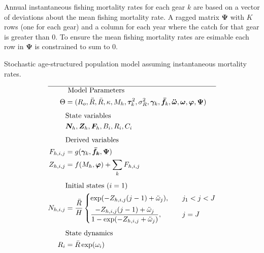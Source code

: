     Annual instantaneous fishing mortality rates for each gear $k$ are based on a vector of deviations about the mean fishing mortality rate.  A ragged matrix $\bm{\Psi}$  with $K$ rows (one for each gear) and a column for each year where the catch for that gear is greater than 0.  To ensure the mean fishing mortality rates are esimable each row in $\bm{\Psi}$  is constrained to sum to 0.



    \begin{table}
    \centering
    \caption{ Stochastic age-structured population model assuming instantaneous mortality rates. }
    \label{tab:stochastic_population_model}
    \tableEq
    \begin{align}
        \hline \nonumber
        &\mbox{ Model Parameters } \nonumber \\
        \Theta &= (R_o,\ddot{R},\bar{R},\kappa,M_h,\bm{\tau}^{2}_{k},
        \sigma_R^2,\bm{\gamma}_k, \bm{\bar{f}}_k,\bm{\ddot{\omega}},
        \bm{\omega},\bm{\varphi},\bm{\Psi})                             \label{T3.1} \\[1ex]
        &\mbox{State variables} \nonumber \\
        &\bm{N}_h, \bm{Z}_h, \bm{F}_h, B_i, R_i, C_i                    \label{T3.2} \\[1ex]
        &\mbox{Derived variables} \nonumber \\
        F_{h,i,j}&= g(\bm{\gamma}_k,\bm{\bar{f}_k},\bm{\Psi})           \label{T3.3} \\
        Z_{h,i,j}&= f(M_h,\bm{\varphi})
        + \sum_k  F_{h,i,j}                                             \label{T3.4} \\[1ex]
        &\mbox{Initial states $(i = 1)$} \nonumber \\
        N_{h,i,j} &= \dfrac{\ddot{R}}{H}
        \begin{cases}
        \exp(-Z_{h,i,j}(j-1)+\ddot{\omega}_j),
        &\quad j_1 < j < J \\[1ex]
        \dfrac{-Z_{h,i,j}(j-1)+\ddot{\omega}_j}{1-\exp(-Z_{h,i,j}+\ddot{\omega}_j)},
        &\quad j = J
        \end{cases}                                                     \label{T3.5} \\[1ex]
        &\mbox{State dynamics} \nonumber \\
        R_i &= \bar{R} \exp(\omega_i)                                   \label{T3.7} \\

\end{align}
\end{table}
